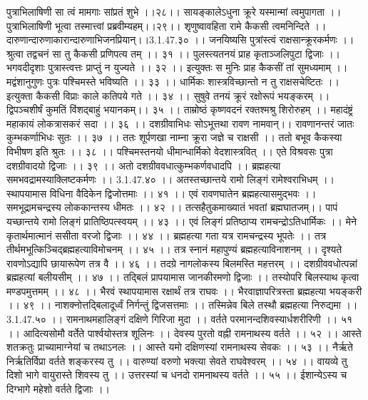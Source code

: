 पुत्राभिलाषिणी सा त्वं मामगाः सांप्रतं शुभे ।।२८।।
सायङ्कालेऽधुना क्रूरे यस्मान्मां त्वमुपागता ।।
पुत्राभिलाषिणी भूत्वा तस्मात्त्वां प्रब्रवीम्यहम्।।२९।।
शृणुष्वावहिता रामे कैकसी त्वमनिन्दिते ।।
दारुणान्दारुणाकारान्दारुणाभिजनप्रियान्।।3.1.47.३० ।।
जनयिष्यसि पुत्रांस्त्वं राक्षसान्क्रूरकर्मणः ।।
श्रुत्वा तद्वचनं सा तु कैकसी प्रणिपत्य तम् ।। ३१ ।।
पुलस्त्यतनयं प्राह कृताञ्जलिपुटा द्विजाः ।।
भगवदीदृशाः पुत्रास्त्वत्तः प्राप्तुं न युज्यते ।। ३२ ।।
इत्युक्तः स मुनिः प्राह कैकसीं तां सुमध्यमाम् ।।
मद्वंशानुगुणः पुत्रः पश्चिमस्ते भविष्यति ।। ३३ ।।
धार्मिकः शास्त्रविच्छान्तो न तु राक्षसचेष्टितः ।।
इत्युक्ता कैकसी विप्राः काले कतिपये गते ।। ३४ ।।
सुषुवे तनयं क्रूरं रक्षोरूपं भयङ्करम् ।।
द्विपञ्चशीर्षं कुमतिं विंशद्बाहुं भयानकम्।। ३५ ।।
ताम्रोष्ठं कृष्णवदनं रक्तश्मश्रु शिरोरुहम् ।।
महादंष्ट्रं महाकायं लोकत्रासकरं सदा ।। ३६ ।।
दशग्रीवाभिधः सोऽभूत्तथा रावण नामवान्।।
रावणानन्तरं जातः कुम्भकर्णाभिधः सुतः ।। ३७ ।।
ततः शूर्पणखा नाम्ना क्रूरा जज्ञे च राक्षसी ।।
ततो बभूव कैकस्या विभीषण इति श्रुतः ।। ३८ ।।
पश्चिमस्तनयो धीमान्धार्मिको वेदशास्त्रवित् ।।
एते विश्रवसः पुत्रा दशग्रीवादयो द्विजाः ।। ३९ ।।
अतो दशग्रीववधात्कुम्भकर्णवधादपि ।।
ब्रह्महत्या समभवद्रामस्याक्लिष्टकर्मणः ।। 3.1.47.४० ।।
अतस्तच्छान्तये रामो लिङ्गं रामेश्वराभिधम् ।।
स्थापयामास विधिना वैदिकेन द्विजोत्तमाः ।। ४१ ।।
एवं रावणघातेन ब्रह्महत्यासमुद्भवः ।।
समभूद्रामचन्द्रस्य लोककान्तस्य धीमतः ।। ४२ ।।
तत्सहैतुकमाख्यातं भवतां ब्रह्मघातजम्।।
पापं यच्छान्तये रामो लिङ्गं प्रातिष्ठिपत्स्वयम् ।। ४३ ।।
एवं लिङ्गं प्रतिष्ठाप्य रामचन्द्रोऽतिधार्मिकः ।।
मेने कृतार्थमात्मानं ससीता वरजो द्विजाः ।। ४४ ।।
ब्रह्महत्या गता यत्र रामचन्द्रस्य भूपतेः ।।
तत्र तीर्थमभूत्किञ्चिद्ब्रह्महत्याविमोचनम् ।। ४५ ।।
तत्र स्नानं महापुण्यं ब्रह्महत्याविनाशनम् ।।
दृश्यते रावणोऽद्यापि छायारूपेण तत्र वै ।। ४६ ।।
तदग्रे नागलोकस्य बिलमस्ति महत्तरम् ।।
दशग्रीववधोत्पन्नां ब्रह्महत्यां बलीयसीम् ।। ४७ ।।
तद्बिलं प्रापयामास जानकीरमणो द्विजाः ।।
तस्योपरि बिलस्याथ कृत्वा मण्डपमुत्तमम् ।। ४८ ।।
भैरवं स्थापयामास रक्षार्थं तत्र राघवः ।।
भैरवाज्ञापरित्रस्ता ब्रह्महत्या भयङ्करी ।। ४९ ।।
नाशक्नोत्तद्बिलादूर्ध्वं निर्गन्तुं द्विजसत्तमाः ।।
तस्मिन्नेव बिले तस्थौ ब्रह्महत्या निरुद्यमा ।। 3.1.47.५० ।।
रामनाथमहालिङ्गं दक्षिणे गिरिजा मुदा ।।
वर्तते परमानन्दशिवस्यार्धशरीरिणी ।। ५१ ।।
आदित्यसोमौ वर्तेते पार्श्वयोस्तत्र शूलिनः ।।
देवस्य पुरतो वह्नी रामनाथस्य वर्तते ।। ५२ ।।
आस्ते शतक्रतुः प्राच्यामाग्नेयां च तथाऽनलः ।।
आस्ते यमो दक्षिणस्यां रामनाथस्य सेवकः ।। ५३ ।।
नैर्ऋते निर्ऋतिर्विप्रा वर्तते शङ्करस्य तु ।।
वारुण्यां वरुणो भक्त्या सेवते राघवेश्वरम् ।। ५४ ।।
वायव्ये तु दिशो भागे वायुरास्ते शिवस्य तु ।।
उत्तरस्यां च धनदो रामनाथस्य वर्तते ।। ५५ ।।
ईशान्येऽस्य च दिग्भागे महेशो वर्तते द्विजाः ।।
